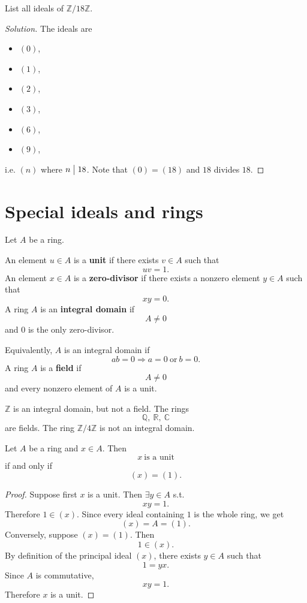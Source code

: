 \begin{prob}
    List all ideals of $\mathbb Z/18\mathbb Z$. 
\end{prob}
\begin{proof}[Solution]
    The ideals are 
    \begin{itemize}
        \item $(0)$, 
        \item $(1)$,
        \item $(2)$, 
        \item $(3)$, 
        \item $(6)$, 
        \item $(9)$,  
    \end{itemize}
    i.e. $(n)$ where $n \bigm| 18$. 
    Note that $(0) = (18)$ and $18$ divides $18$.
\end{proof}

\section{Special ideals and rings}

\begin{defn}
    Let $A$ be a ring. 

    An element $u \in A$ is a \textbf{unit} if there 
    exists $v \in A$ such that 
    \[
        uv = 1.
    \]
    An element $x \in A$ is a \textbf{zero-divisor} 
    if there exists a nonzero element $y \in A$ 
    such that 
    \[
        xy = 0.
    \]
    A ring $A$ is an \textbf{integral domain} if 
    \[
        A \neq 0
    \]
    and $0$ is the only zero-divisor. 

    Equivalently, $A$ is an integral domain if 
    \[
        ab = 0 \Rightarrow a = 0 \ \text{or} \ b = 0. 
    \]
    A ring $A$ is a \textbf{field} if 
    \[
        A \neq 0
    \]
    and every nonzero element of $A$ is a unit. 
\end{defn}
\begin{ex}
    $\mathbb Z$ is an integral domain, but not a field. 
    The rings 
    \[
        \mathbb Q, \ \mathbb R, \ \mathbb C
    \]
    are fields. 
    The ring $\mathbb Z/4 \mathbb Z$ is not an integral 
    domain. 
\end{ex}

\begin{prop}
    Let $A$ be a ring and $x \in A$. Then 
    \[
        x \ \text{is a unit}
    \]
    if and only if 
    \[
        (x) = (1).
    \]
\end{prop}
\begin{proof}
    Suppose first $x$ is a unit. Then $\exists y \in A$ 
    s.t. 
    \[
        xy = 1. 
    \]
    Therefore $1 \in (x)$. Since every ideal 
    containing $1$ is the whole ring, we get 
    \[
        (x) = A = (1).
    \]
    Conversely, suppose $(x) = (1)$. 
    Then 
    \[
        1 \in (x). 
    \]
    By definition of the principal ideal $(x)$, there exists 
    $y \in A$ such that 
    \[
        1 = yx. 
    \]
    Since $A$ is commutative, 
    \[
        xy = 1.
    \]
    Therefore $x$ is a unit.
\end{proof}

